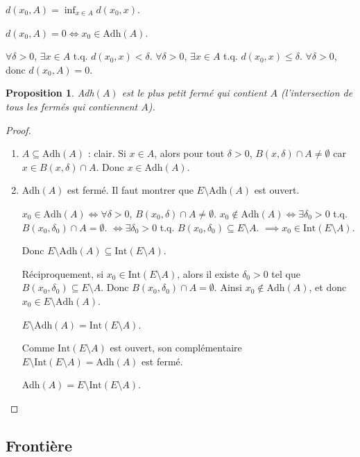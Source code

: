 \documentclass{article}
\newtheorem{proposition}{Proposition}
\begin{document}
$d(x_0, A) = \inf_{x \in A} d(x_0, x)$.

$d(x_0, A) = 0 \iff x_0 \in \text{Adh}(A)$.

$\forall \delta > 0$, $\exists x \in A$ t.q. $d(x_0, x) < \delta$.
$\forall \delta > 0$, $\exists x \in A$ t.q. $d(x_0, x) \leq \delta$.
$\forall \delta > 0$, donc $d(x_0, A) = 0$.

\begin{proposition}
Adh$(A)$ est le plus petit fermé qui contient $A$ (l'intersection de tous les fermés qui contiennent $A$).
\end{proposition}

\begin{proof}
\begin{enumerate}
    \item $A \subseteq \text{Adh}(A)$ : clair. Si $x \in A$, alors pour tout $\delta > 0$, $B(x, \delta) \cap A \neq \emptyset$ car $x \in B(x, \delta) \cap A$. Donc $x \in \text{Adh}(A)$.
    \item Adh$(A)$ est fermé. Il faut montrer que $E \setminus \text{Adh}(A)$ est ouvert.

    $x_0 \in \text{Adh}(A) \iff \forall \delta > 0$, $B(x_0, \delta) \cap A \neq \emptyset$.
    $x_0 \notin \text{Adh}(A) \iff \exists \delta_0 > 0$ t.q. $B(x_0, \delta_0) \cap A = \emptyset$.
    $\iff \exists \delta_0 > 0$ t.q. $B(x_0, \delta_0) \subseteq E \setminus A$.
    $\implies x_0 \in \text{Int}(E \setminus A)$.

    Donc $E \setminus \text{Adh}(A) \subseteq \text{Int}(E \setminus A)$.

    Réciproquement, si $x_0 \in \text{Int}(E \setminus A)$, alors il existe $\delta_0 > 0$ tel que $B(x_0, \delta_0) \subseteq E \setminus A$. Donc $B(x_0, \delta_0) \cap A = \emptyset$. Ainsi $x_0 \notin \text{Adh}(A)$, et donc $x_0 \in E \setminus \text{Adh}(A)$.

    $E \setminus \text{Adh}(A) = \text{Int}(E \setminus A)$.

    Comme $\text{Int}(E \setminus A)$ est ouvert, son complémentaire $E \setminus \text{Int}(E \setminus A) = \text{Adh}(A)$ est fermé.

    Adh$(A) = E \setminus \text{Int}(E \setminus A)$.
\end{enumerate}
\end{proof}


\subsection{Frontière}
\end{document}
